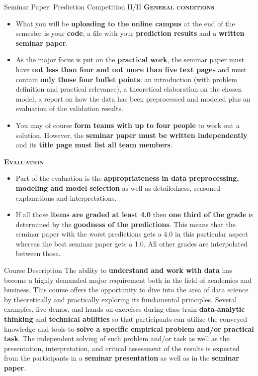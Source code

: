 \documentclass[document.tex]{subfiles}
\begin{document}
    \begin{frame}{Seminar Paper: Prediction Competition II/II}
        \alert{\textbf{\textsc{General conditions}}}
        \vspace{-1mm}
        \begin{itemize}
            \item What you will be \textbf{uploading to the online campus} at the end of the semester is your \textbf{code}, a file with your \textbf{prediction results} and a \textbf{written seminar paper}.
            \item As the major focus is put on the \textbf{practical work}, the seminar paper must have \textbf{not less than four and not more than five text pages} and must contain \textbf{only those four bullet points}: an introduction (with problem definition and practical relevance), a theoretical elaboration on the chosen model, a report on how the data has been preprocessed and modeled plus an evaluation of the validation results.
            \item You may of course \textbf{form teams with up to four people} to work out a solution. However, the \textbf{seminar paper must be written independently} and its \textbf{title page must list all team members}.
        \end{itemize}
        \alert{\textbf{\textsc{Evaluation}}}
        \vspace{-1mm}
        \begin{itemize}
            \item Part of the evaluation is the \textbf{appropriateness in data preprocessing, modeling and model selection} as well as detailedness, reasoned explanations and interpretations.
            \item If all those \textbf{items are graded at least 4.0} then \textbf{one third of the grade} is determined by the \textbf{goodness of the predictions}. This means that the seminar paper with the worst predictions gets a 4.0 in this particular aspect whereas the best seminar paper gets a 1.0. All other grades are interpolated between those.
        \end{itemize}
    \end{frame}
    \else
    \begin{frame}{Course Description}
        The ability to \textbf{understand and work with data} has become a highly demanded major requirement both in the field of academics and business. This course offers the opportunity to dive into the area of data science by theoretically and practically exploring its fundamental principles. Several examples, live demos, and hands-on exercises during class train \textbf{data-analytic thinking} and \textbf{technical abilities} so that participants can utilize the conveyed knowledge and tools to \textbf{solve a specific empirical problem and/or practical task}. The independent solving of such problem and/or task as well as the presentation, interpretation, and critical assessment of the results is expected from the participants in a \textbf{seminar presentation} as well as in the \textbf{seminar paper}.
    \end{frame}
    \fi
\end{document}
